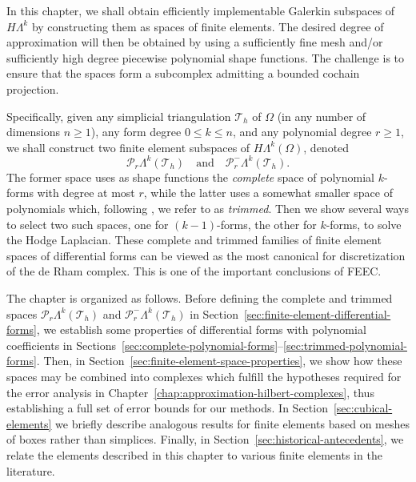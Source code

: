 {In this chapter, we shall obtain efficiently implementable Galerkin subspaces of $H\Lambda^k$ by constructing them as spaces of finite elements. The desired degree of approximation will then be obtained by using a sufficiently fine mesh and/or sufficiently high degree piecewise polynomial shape functions. The challenge is to ensure that the spaces form a subcomplex admitting a bounded cochain projection.}

{Specifically, given any simplicial triangulation $\mathcal T_h$ of $\Omega$ (in any number of dimensions $n\geq1$), any form degree $0\leq k\leq n$, and any polynomial degree $r\geq1$, we shall construct two finite element subspaces of $H\Lambda^k(\Omega)$, denoted}
\[
\mathcal P_r\Lambda^k(\mathcal T_h)\quad{\text{and}}\quad\mathcal P_r^-\Lambda^k(\mathcal T_h).
\]
{The former space uses as shape functions the \emph{complete} space of polynomial $k$-forms with degree at most $r$, while the latter uses a somewhat smaller space of polynomials which, following , we refer to as \emph{trimmed}. Then we show several ways to select two such spaces, one for $(k-1)$-forms, the other for $k$-forms, to solve the Hodge Laplacian. These complete and trimmed families of finite element spaces of differential forms can be viewed as the most canonical for discretization of the de Rham complex. This is one of the important conclusions of FEEC.}

{The chapter is organized as follows. Before defining the complete and trimmed spaces $\mathcal P_r\Lambda^k(\mathcal T_h)$ and $\mathcal P_r^-\Lambda^k(\mathcal T_h)$ in Section~\ref{sec:finite-element-differential-forms}, we establish some properties of differential forms with polynomial coefficients in Sections~\ref{sec:complete-polynomial-forms}--\ref{sec:trimmed-polynomial-forms}. Then, in Section~\ref{sec:finite-element-space-properties}, we show how these spaces may be combined into complexes which fulfill the hypotheses required for the error analysis in Chapter~\ref{chap:approximation-hilbert-complexes}, thus establishing a full set of error bounds for our methods. In Section~\ref{sec:cubical-elements} we briefly describe analogous results for finite elements based on meshes of boxes rather than simplices. Finally, in Section~\ref{sec:historical-antecedents}, we relate the elements described in this chapter to various finite elements in the literature.}


